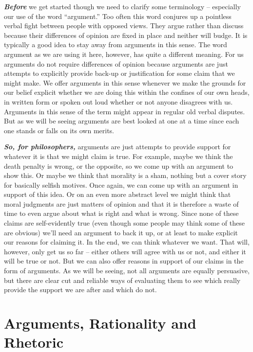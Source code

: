 \documentclass[12pt, openany]{book}
\begin{document}
\textbf{\emph{Before}} we get started though we need to clarify some terminology -- especially our use of the word ``argument.'' Too often this word conjures up a pointless verbal fight between people with opposed views. They argue rather than discuss because their differences of opinion are fixed in place and neither will budge. It is typically a good idea to stay away from arguments in this sense. The word argument as we are using it here, however, has quite a different meaning. For us arguments do not require differences of opinion because arguments are just attempts to explicitly provide back-up or justification for some claim that we might make. We offer arguments in this sense whenever we make the grounds for our belief explicit whether we are doing this within the confines of our own heads, in written form or spoken out loud whether or not anyone disagrees with us. Arguments in this sense of the term might appear in regular old verbal disputes. But as we will be seeing arguments are best looked at one at a time since each one stands or falls on its own merits.

\textbf{\emph{So, for philosophers,}} arguments are just attempts to provide support for whatever it is that we might claim is true. For example, maybe we think the death penalty is wrong, or the opposite, so we come up with an argument to show this. Or maybe we think that morality is a sham, nothing but a cover story for basically selfish motives. Once again, we can come up with an argument in support of this idea. Or on an even more abstract level we might think that moral judgments are just matters of opinion and that it is therefore a waste of time to even argue about what is right and what is wrong. Since none of these claims are self-evidently true (even though some people may think some of these are obvious) we'll need an argument to back it up, or at least to make explicit our reasons for claiming it. In the end, we can think whatever we want. That will, however, only get us so far -- either others will agree with us or not, and either it will be true or not. But we can also offer reasons in support of our claims in the form of arguments. As we will be seeing, not all arguments are equally persuasive, but there are clear cut and reliable ways of evaluating them to see which really provide the support we are after and which do not.

\hypertarget{arguments-rationality-and-rhetoric}{%
\section{Arguments, Rationality and Rhetoric}\label{arguments-rationality-and-rhetoric}}
\end{document}
